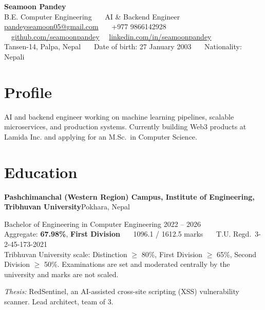 \documentclass[a4paper,10pt]{article}
\newcommand{\entry}[2]{\textbf{#1}\hfill{\color{rulegray}\small #2}\par\vspace{1pt}}
\newcommand{\note}[1]{{\small\color{rulegray} #1}\par}
\begin{document}
\begin{center}
{\LARGE \textbf{Seamoon Pandey}}\\[2pt]
{\color{rulegray}B.E. Computer Engineering \ \textbar\ \ AI \& Backend Engineer}\\[3pt]
\href{mailto:pandeyseamoon05@gmail.com}{pandeyseamoon05@gmail.com} \ \textbar\ \ +977 9866142928 \ \textbar\
\href{https://github.com/seamoonpandey}{github.com/seamoonpandey} \ \textbar\
\href{https://www.linkedin.com/in/seamoonpandey/}{linkedin.com/in/seamoonpandey}\\[2pt]
{\color{rulegray}\small Tansen-14, Palpa, Nepal \ \textbar\ \ Date of birth: 27 January 2003 \ \textbar\ \ Nationality: Nepali}
\end{center}

\section*{Profile}

AI and backend engineer working on machine learning pipelines, scalable microservices, and production systems. Currently building Web3 products at Lamida Inc. and applying for an M.Sc.\ in Computer Science.

\section*{Education}

\entry{Pashchimanchal (Western Region) Campus, Institute of Engineering, Tribhuvan University}{Pokhara, Nepal}
Bachelor of Engineering in Computer Engineering \hfill {\color{rulegray}\small 2022 -- 2026}\\
Aggregate: \textbf{67.98\%}, \textbf{First Division} \ \textbar\ \ 1096.1 / 1612.5 marks \ \textbar\ \ T.U. Regd.\ 3-2-45-173-2021\\
\note{Tribhuvan University scale: Distinction $\geq$ 80\%, First Division $\geq$ 65\%, Second Division $\geq$ 50\%. Examinations are set and moderated centrally by the university and marks are not scaled.}
\vspace{2pt}
\textit{Thesis:} RedSentinel, an AI-assisted cross-site scripting (XSS) vulnerability scanner. Lead architect, team of 3.

\end{document}
